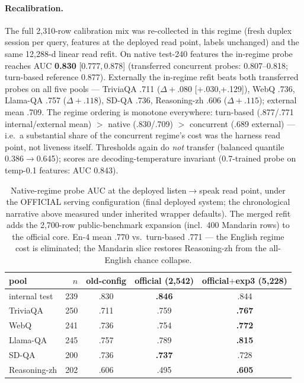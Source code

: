 \paragraph{Recalibration.} The full 2{,}310-row calibration mix was
re-collected in this regime (fresh duplex session per query, features
at the deployed read point, labels unchanged) and the same 12{,}288-d
linear read refit. On native test-240 features the in-regime probe
reaches AUC \textbf{0.830} [0.777,\,0.878] (transferred concurrent
probes: 0.807--0.818; turn-based reference 0.877). Externally the
in-regime refit beats both transferred probes on all five pools ---
TriviaQA .711 ($\Delta{+}.080$ [+.030,+.129]), WebQ .736, Llama-QA
.757 ($\Delta{+}.118$), SD-QA .736, Reasoning-zh .606
($\Delta{+}.115$); external mean .709. The regime ordering is
monotone everywhere: turn-based (.877/.771 internal/external mean)
$>$ native (.830/.709) $>$ concurrent (.689 external) --- i.e.\ a
substantial share of the concurrent regime's cost was the harness
read point, not liveness itself. Thresholds again do \emph{not}
transfer (balanced quantile 0.386$\to$0.645); scores are
decoding-temperature invariant (0.7-trained probe on temp-0.1
features: AUC 0.843).

\begin{table}[t]
\centering\small
\caption{Native-regime probe AUC at the deployed listen$\to$speak
read point, under the OFFICIAL serving configuration (final deployed
system; the chronological narrative above measured under inherited
wrapper defaults). The merged refit adds the 2{,}700-row
public-benchmark expansion (incl.\ 400 Mandarin rows) to the official
core. En-4 mean .770 vs.\ turn-based .771 --- the English regime cost
is eliminated; the Mandarin slice restores Reasoning-zh from the
all-English chance collapse.}
\label{tab:native-auc}
\begin{tabular}{lrccc}
\toprule
pool & $n$ & old-config & official (2{,}542) & \textbf{official$+$exp3 (5{,}228)} \\
\midrule
internal test & 239 & .830 & \textbf{.846} & .844 \\
TriviaQA & 250 & .711 & .759 & \textbf{.767} \\
WebQ & 241 & .736 & .754 & \textbf{.772} \\
Llama-QA & 245 & .757 & .789 & \textbf{.815} \\
SD-QA & 200 & .736 & \textbf{.737} & .728 \\
Reasoning-zh & 202 & .606 & .495 & \textbf{.605} \\
\bottomrule
\end{tabular}
\end{table}

